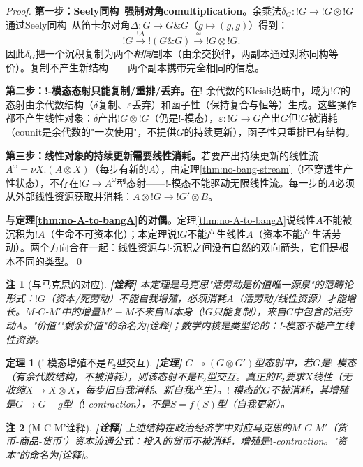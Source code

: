 \documentclass[11pt,a4paper]{article}
\newtheorem{theorem}{定理}
\newtheorem{remark}{注}
\newcommand{\lvl}[1]{\hfill\textbf{\footnotesize[#1]}}
\newcommand{\lvP}{\lvl{定理}}
\newcommand{\lvI}{\lvl{诠释}}
\newcommand{\bang}{{!}}
\newcommand{\tensor}{\otimes}
\begin{document}
\begin{proof}
\textbf{第一步：Seely同构~\cite{seely89}强制对角comultiplication。}余乘法$\delta_G:\bang G\to\bang G\tensor\bang G$通过Seely同构~\cite{seely89}从笛卡尔对角$\Delta:G\to G\&G$（$g\mapsto(g,g)$）得到：
$$\bang G\xrightarrow{\bang\Delta}\bang(G\&G)\xrightarrow{\cong}\bang G\tensor\bang G.$$
因此$\delta_G$把一个沉积复制为两个\emph{相同}副本（由余交换律，两副本通过对称同构等价）。复制不产生新结构——两个副本携带完全相同的信息。

\textbf{第二步：!-模态态射只能复制/重排/丢弃。}在!-余代数的Kleisli范畴中，域为$\bang G$的态射由余代数结构（$\delta$复制、$\varepsilon$丢弃）和函子性（保持复合与恒等）生成。这些操作都不产生线性对象：$\delta$产出$\bang G\tensor\bang G$（仍是!-模态），$\varepsilon:\bang G\to G$产出$G$但$\bang G$被消耗（counit是余代数的"一次使用"，不提供$G$的持续更新），函子性只重排已有结构。

\textbf{第三步：线性对象的持续更新需要线性消耗。}若要产出持续更新的线性流$A^\omega=\nu X.(A\tensor X)$（每步有新的$A$），由定理\ref{thm:no-bang-stream}（!不穿透生产性状态），不存在$\bang G\to A^\omega$型态射——!-模态不能驱动无限线性流。每一步的$A$必须从外部线性资源获取并消耗：$A\tensor\bang G\to\bang G'\tensor B$。

\textbf{与定理\ref{thm:no-A-to-bangA}的对偶。}定理\ref{thm:no-A-to-bangA}说线性$A$不能被沉积为$\bang A$（生命不可资本化）；本定理说$\bang G$不能产生线性$A$（资本不能产生活劳动）。两个方向合在一起：线性资源与!-沉积之间没有自然的双向箭头，它们是根本不同的类型。\qed
\end{proof}

\begin{remark}[与马克思的对应]\lvI
本定理是马克思"活劳动是价值唯一源泉"的范畴论形式：$\bang G$（资本/死劳动）不能自我增殖，必须消耗$A$（活劳动/线性资源）才能增长。$M$-$C$-$M'$中的增量$M'-M$不来自$M$本身（$\bang G$只能复制），来自$C$中包含的活劳动$A$。"价值""剩余价值"的命名为[诠释]；数学内核是类型论的：!-模态不能产生线性资源。
\end{remark}

\begin{theorem}[!-模态增殖不是$F_2$型交互]\label{thm:fake-f2}\lvP
$G\multimap(G\tensor G')$型态射中，若$G$是$\bang$-模态（有余代数结构，不被消耗），则该态射不是$F_2$型交互。真正的$F_2$要求$X$线性（无收缩$X\to X\tensor X$，每步旧自我消耗、新自我产生）。$\bang$-模态的$G$不被消耗，其增殖是$G\to G+g$型（$\bang$-contraction），不是$S=f(S)$型（自我更新）。
\end{theorem}

\begin{remark}[{M-C-M\textquoteright 诠释}]\lvI
上述结构在政治经济学中对应马克思的$M$-$C$-$M'$（货币-商品-货币'）资本流通公式：投入的货币不被消耗，增殖是$\bang$-contraction。"资本"的命名为[诠释]。
\end{remark}
\end{document}
